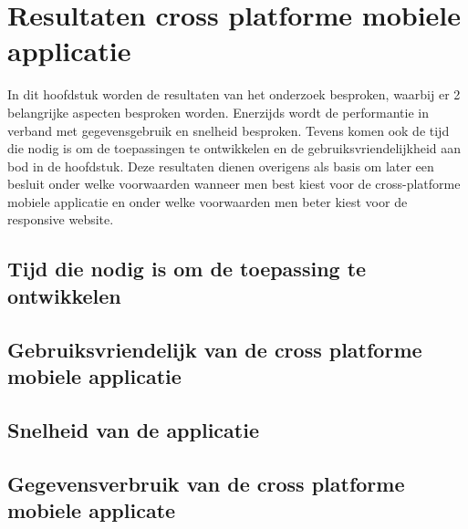 \chapter{Resultaten cross platforme mobiele applicatie}
\label{ch:resultatencrossplatformapp}
In dit hoofdstuk worden de resultaten van het onderzoek besproken, waarbij er 2 belangrijke aspecten besproken worden.
Enerzijds wordt de performantie in verband met gegevensgebruik en  snelheid besproken.
Tevens komen ook de tijd die nodig is om de toepassingen te ontwikkelen en de gebruiksvriendelijkheid aan bod in de hoofdstuk.
Deze resultaten dienen overigens als basis om later een besluit onder welke voorwaarden wanneer men best kiest voor de
cross-platforme mobiele applicatie en onder welke voorwaarden men beter kiest voor de responsive website.

\section{Tijd die nodig is om de toepassing te ontwikkelen}

\section{Gebruiksvriendelijk van de cross platforme mobiele applicatie}

\section{Snelheid van de applicatie}

\section{Gegevensverbruik van de cross platforme mobiele applicate}

\section{}
